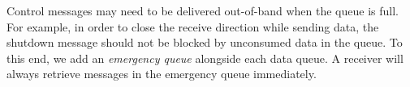 Control messages may need to be delivered out-of-band when the queue is full. For example, in order to close the receive direction while sending data, the shutdown message should not be blocked by unconsumed data in the queue. To this end, we add an \textit{emergency queue} alongside each data queue.
A receiver will always retrieve messages in the emergency queue immediately.
\fi

